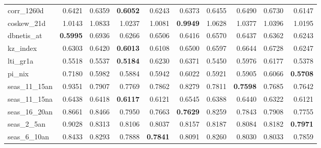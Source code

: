 \begin{longtable}{>{\raggedright\arraybackslash}p{2.6cm}rrrrrrrrr}
corr\_1260d & 0.6421 & \cellcolor{blue!10}0.6359 & \textbf{\cellcolor{blue!10}0.6052} & \cellcolor{blue!10}0.6243 & \cellcolor{blue!10}0.6373 & 0.6455 & 0.6490 & 0.6730 & \cellcolor{blue!10}0.6147 \\
coskew\_21d & 1.0143 & 1.0833 & 1.0237 & \cellcolor{blue!10}1.0081 & \textbf{\cellcolor{blue!10}0.9949} & 1.0628 & 1.0377 & 1.0396 & 1.0195 \\
dbnetis\_at & \textbf{0.5995} & 0.6936 & 0.6266 & 0.6506 & 0.6416 & 0.6570 & 0.6437 & 0.6362 & 0.6243 \\
kz\_index & 0.6303 & 0.6420 & \textbf{\cellcolor{blue!10}0.6013} & \cellcolor{blue!10}0.6108 & 0.6500 & 0.6597 & 0.6644 & 0.6728 & \cellcolor{blue!10}0.6247 \\
lti\_gr1a & 0.5518 & 0.5537 & \textbf{\cellcolor{blue!10}0.5184} & 0.6230 & 0.6371 & \cellcolor{blue!10}0.5450 & 0.5976 & 0.6177 & \cellcolor{blue!10}0.5378 \\
pi\_nix & 0.7180 & \cellcolor{blue!10}0.5982 & \cellcolor{blue!10}0.5884 & \cellcolor{blue!10}0.5942 & \cellcolor{blue!10}0.6022 & \cellcolor{blue!10}0.5921 & \cellcolor{blue!10}0.5905 & \cellcolor{blue!10}0.6066 & \textbf{\cellcolor{blue!10}0.5708} \\
seas\_11\_15an & 0.9351 & \cellcolor{blue!10}0.7907 & \cellcolor{blue!10}0.7769 & \cellcolor{blue!10}0.7862 & \cellcolor{blue!10}0.8279 & \cellcolor{blue!10}0.7811 & \textbf{\cellcolor{blue!10}0.7598} & \cellcolor{blue!10}0.7685 & \cellcolor{blue!10}0.7642 \\
seas\_11\_15na & 0.6438 & \cellcolor{blue!10}0.6418 & \textbf{\cellcolor{blue!10}0.6117} & \cellcolor{blue!10}0.6121 & 0.6545 & \cellcolor{blue!10}0.6388 & 0.6440 & \cellcolor{blue!10}0.6322 & \cellcolor{blue!10}0.6121 \\
seas\_16\_20an & 0.8661 & \cellcolor{blue!10}0.8466 & \cellcolor{blue!10}0.7950 & \cellcolor{blue!10}0.7663 & \textbf{\cellcolor{blue!10}0.7629} & \cellcolor{blue!10}0.8259 & \cellcolor{blue!10}0.7843 & \cellcolor{blue!10}0.7908 & \cellcolor{blue!10}0.7755 \\
seas\_2\_5an & 0.9028 & \cellcolor{blue!10}0.8313 & \cellcolor{blue!10}0.8106 & \cellcolor{blue!10}0.8037 & \cellcolor{blue!10}0.8157 & \cellcolor{blue!10}0.8187 & \cellcolor{blue!10}0.8084 & \cellcolor{blue!10}0.8182 & \textbf{\cellcolor{blue!10}0.7971} \\
seas\_6\_10an & 0.8433 & \cellcolor{blue!10}0.8293 & \cellcolor{blue!10}0.7888 & \textbf{\cellcolor{blue!10}0.7841} & \cellcolor{blue!10}0.8091 & \cellcolor{blue!10}0.8260 & \cellcolor{blue!10}0.8030 & \cellcolor{blue!10}0.8033 & \cellcolor{blue!10}0.7859 \\

\end{longtable}
